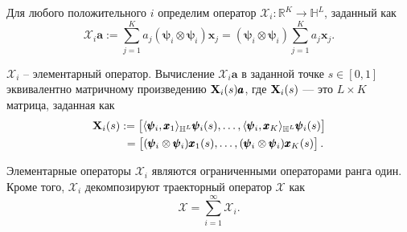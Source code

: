 \documentclass[12pt, specialist, subf
]{disser}
\theoremstyle{definition}
\begin{document}
Для любого положительного $i$ определим оператор $\mathcal{X}_i:\mathbb{R}^K\rightarrow\mathbb{H}^L$, заданный как
\begin{equation}\label{eq: elementary oprator}
	\mathcal{X}_i \pmb{a}:=\sum_{j=1}^K a_j (\pmb{\psi}_i\otimes \pmb{\psi}_i){\pmb x}_j= (\pmb{\psi}_i\otimes \pmb{\psi}_i)\sum_{j=1}^K a_j{\pmb x}_j.
\end{equation}

$\mathcal{X}_i$ -- элементарный оператор. Вычисление $\mathcal{X}_i \pmb{a}$ в заданной точке $s\in [0,1]$ эквивалентно матричному произведению ${\bf X}_i(s)\pmb{a}$, где ${\bf X}_i(s)$ — это $L \times K$ матрица, заданная как
\begin{align}\label{eq:elementary mat}
	{\bf X}_i(s) & :=
	\begin{bmatrix} \langle\pmb{\psi}_i, {\pmb x}_1\rangle_{\mathbb{H}^L} \pmb{\psi}_i(s), \ldots, \langle\pmb{\psi}_i, {\pmb x}_K\rangle_{\mathbb{H}^L} \pmb{\psi}_i(s) \end{bmatrix}
	\notag            \\ &\ =
	\begin{bmatrix} (\pmb{\psi}_i\otimes \pmb{\psi}_i){\pmb x}_1(s), \ldots, (\pmb{\psi}_i\otimes \pmb{\psi}_i){\pmb x}_K(s) \end{bmatrix}.
\end{align}



Элементарные операторы $\mathcal{X}_i$ являются ограниченными операторами ранга один. Кроме того, $\mathcal{X}_i$ декомпозируют траекторный оператор $\mathcal{X}$ как
\begin{equation}\label{eq:elementary operators}
	\mathcal{X}=\sum_{i=1}^\infty \mathcal{X}_i.
\end{equation}
\end{document}
